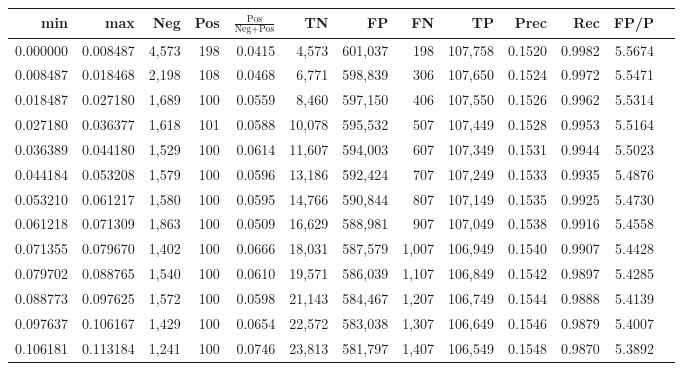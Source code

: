 \begin{tabular}{rrrrrrrrrrrrr}
\toprule
     min &      max &   Neg & Pos & $\frac{\text{Pos}}{\text{Neg}+\text{Pos}}$ &      TN &      FP &      FN &      TP &   Prec &    Rec &   FP/P \\
\midrule
0.000000 & 0.008487 & 4,573 & 198 &                                     0.0415 &   4,573 & 601,037 &     198 & 107,758 & 0.1520 & 0.9982 & 5.5674 \\
0.008487 & 0.018468 & 2,198 & 108 &                                     0.0468 &   6,771 & 598,839 &     306 & 107,650 & 0.1524 & 0.9972 & 5.5471 \\
0.018487 & 0.027180 & 1,689 & 100 &                                     0.0559 &   8,460 & 597,150 &     406 & 107,550 & 0.1526 & 0.9962 & 5.5314 \\
0.027180 & 0.036377 & 1,618 & 101 &                                     0.0588 &  10,078 & 595,532 &     507 & 107,449 & 0.1528 & 0.9953 & 5.5164 \\
0.036389 & 0.044180 & 1,529 & 100 &                                     0.0614 &  11,607 & 594,003 &     607 & 107,349 & 0.1531 & 0.9944 & 5.5023 \\
0.044184 & 0.053208 & 1,579 & 100 &                                     0.0596 &  13,186 & 592,424 &     707 & 107,249 & 0.1533 & 0.9935 & 5.4876 \\
0.053210 & 0.061217 & 1,580 & 100 &                                     0.0595 &  14,766 & 590,844 &     807 & 107,149 & 0.1535 & 0.9925 & 5.4730 \\
0.061218 & 0.071309 & 1,863 & 100 &                                     0.0509 &  16,629 & 588,981 &     907 & 107,049 & 0.1538 & 0.9916 & 5.4558 \\
0.071355 & 0.079670 & 1,402 & 100 &                                     0.0666 &  18,031 & 587,579 &   1,007 & 106,949 & 0.1540 & 0.9907 & 5.4428 \\
0.079702 & 0.088765 & 1,540 & 100 &                                     0.0610 &  19,571 & 586,039 &   1,107 & 106,849 & 0.1542 & 0.9897 & 5.4285 \\
0.088773 & 0.097625 & 1,572 & 100 &                                     0.0598 &  21,143 & 584,467 &   1,207 & 106,749 & 0.1544 & 0.9888 & 5.4139 \\
0.097637 & 0.106167 & 1,429 & 100 &                                     0.0654 &  22,572 & 583,038 &   1,307 & 106,649 & 0.1546 & 0.9879 & 5.4007 \\
0.106181 & 0.113184 & 1,241 & 100 &                                     0.0746 &  23,813 & 581,797 &   1,407 & 106,549 & 0.1548 & 0.9870 & 5.3892 \\

\end{tabular}

